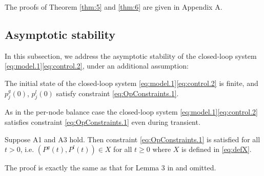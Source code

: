 The proofs of Theorem \ref{thm:5} and \ref{thm:6} are given in Appendix A. 


\subsection{Asymptotic stability}
 In this subsection, we address the asymptotic stability of the closed-loop 
 system \eqref{eq:model.1}\eqref{eq:control.2}, under an additional assumption:
 \bi
 \item[\textbf{A3:}] The initial state of the closed-loop system  \eqref{eq:model.1}\eqref{eq:control.2} is finite, and $p^g_j(0)$, $p^l_j(0)$  satisfy constraint \eqref{eq:OpConstraints.1}. 
 \ei
 
 As in the per-node balance case the closed-loop system \eqref{eq:model.1}\eqref{eq:control.2} 
satisfies constraint \eqref{eq:OpConstraints.1} even during transient.
\begin{lemma}
        \label{lemma:bounded.2}
        Suppose A1 and A3 hold. 
        Then constraint \eqref{eq:OpConstraints.1} is satisfied for all  $t>0$, i.e. 
        $(P^g(t), P^l(t))\in X$ for all $t\geq 0$ where $X$ is defined in \eqref{eq:defX}.    
\end{lemma}
The proof is exactly the same as that for Lemma 3 in \cite{Wang:DistributedFrequency} and omitted.

% 


